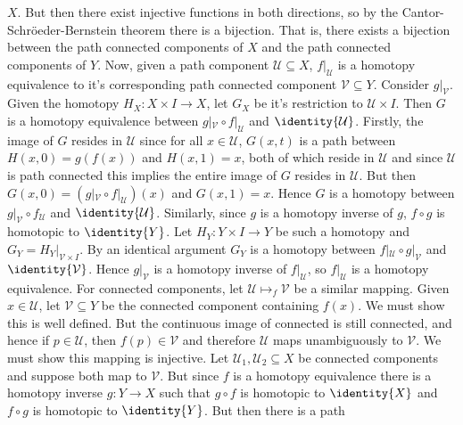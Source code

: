\begin{solution}
        $X$. But then there exist injective functions in both directions, so by
        the Cantor-Schr\"{o}eder-Bernstein theorem there is a bijection. That
        is, there exists a bijection between the path connected components
        of $X$ and the path connected components of $Y$. Now, given a path
        component $\mathcal{U}\subseteq{X}$, $f|_{\mathcal{U}}$ is a homotopy
        equivalence to it's corresponding path connected component
        $\mathcal{V}\subseteq{Y}$. Consider $g|_{\mathcal{V}}$. Given the
        homotopy $H_{X}:X\times{I}\rightarrow{X}$, let $G_{X}$ be it's
        restriction to $\mathcal{U}\times{I}$. Then $G$ is a homotopy
        equivalence between $g|_{\mathcal{V}}\circ{f}|_{\mathcal{U}}$ and
        $\identity{\mathcal{U}}$. Firstly, the image of $G$ resides in
        $\mathcal{U}$ since for all $x\in\mathcal{U}$, $G(x,t)$ is a path
        between $H(x,0)=g(f(x))$ and $H(x,1)=x$, both of which reside in
        $\mathcal{U}$ and since $\mathcal{U}$ is path connected this implies the
        entire image of $G$ resides in $\mathcal{U}$. But then
        $G(x,0)=(g|_{\mathcal{V}}\circ{f}|_{\mathcal{U}})(x)$ and $G(x,1)=x$.
        Hence $G$ is a homotopy between $g|_{\mathcal{V}}\circ{f}_{\mathcal{U}}$
        and $\identity{\mathcal{U}}$. Similarly, since $g$ is a homotopy inverse
        of $g$, $f\circ{g}$ is homotopic to $\identity{Y}$. Let
        $H_{Y}:Y\times{I}\rightarrow{Y}$ be such a homotopy and
        $G_{Y}=H_{Y}|_{\mathcal{V}\times{I}}$. By an identical argument $G_{Y}$
        is a homotopy between $f|_{\mathcal{U}}\circ{g}|_{\mathcal{V}}$ and
        $\identity{\mathcal{V}}$. Hence $g|_{\mathcal{V}}$ is a homotopy inverse
        of $f|_{\mathcal{U}}$, so $f|_{\mathcal{U}}$ is a homotopy equivalence.
        For connected components, let $\mathcal{U}\mapsto_{f}\mathcal{V}$ be a
        similar mapping. Given $x\in\mathcal{U}$, let $\mathcal{V}\subseteq{Y}$
        be the connected component containing $f(x)$. We must show this is well
        defined. But the continuous image of connected is still connected, and
        hence if $p\in\mathcal{U}$, then $f(p)\in\mathcal{V}$ and therefore
        $\mathcal{U}$ maps unambiguously to $\mathcal{V}$. We must show this
        mapping is injective. Let $\mathcal{U}_{1},\mathcal{U}_{2}\subseteq{X}$
        be connected components and suppose both map to $\mathcal{V}$. But since
        $f$ is a homotopy equivalence there is a homotopy inverse
        $g:Y\rightarrow{X}$ such that $g\circ{f}$ is homotopic to $\identity{X}$
        and $f\circ{g}$ is homotopic to $\identity{Y}$. But then there is a path

\end{solution}
